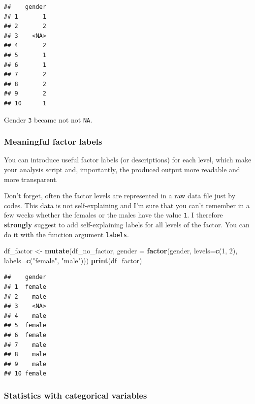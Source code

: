 \documentclass[
]{scrartcl}
\newenvironment{Shaded}{\begin{snugshade}}{\end{snugshade}}
\newcommand{\AttributeTok}[1]{\textcolor[rgb]{0.13,0.29,0.53}{#1}}
\newcommand{\DecValTok}[1]{\textcolor[rgb]{0.00,0.00,0.81}{#1}}
\newcommand{\FunctionTok}[1]{\textcolor[rgb]{0.13,0.29,0.53}{\textbf{#1}}}
\newcommand{\NormalTok}[1]{#1}
\newcommand{\OtherTok}[1]{\textcolor[rgb]{0.56,0.35,0.01}{#1}}
\newcommand{\StringTok}[1]{\textcolor[rgb]{0.31,0.60,0.02}{#1}}
\begin{document}
\begin{verbatim}
##    gender
## 1       1
## 2       2
## 3    <NA>
## 4       2
## 5       1
## 6       1
## 7       2
## 8       2
## 9       2
## 10      1
\end{verbatim}

Gender \texttt{3} became not not \texttt{NA}.

\subsubsection{Meaningful factor labels}\label{meaningful-factor-labels}

You can introduce useful factor labels (or descriptions) for each level, which make your analysis script and, importantly, the produced output more readable and more transparent.

Don't forget, often the factor levels are represented in a raw data file just by codes. This data is not self-explaining and I'm sure that you can't remember in a few weeks whether the females or the males have the value \texttt{1}. I therefore \textbf{strongly} suggest to add self-explaining labels for all levels of the factor. You can do it with the function argument \texttt{labels}.

\begin{Shaded}
\begin{Highlighting}[]
\NormalTok{df\_factor }\OtherTok{\textless{}{-}}  \FunctionTok{mutate}\NormalTok{(df\_no\_factor,}
            \AttributeTok{gender =} \FunctionTok{factor}\NormalTok{(gender, }\AttributeTok{levels=}\FunctionTok{c}\NormalTok{(}\DecValTok{1}\NormalTok{, }\DecValTok{2}\NormalTok{), }\AttributeTok{labels=}\FunctionTok{c}\NormalTok{(}\StringTok{"female"}\NormalTok{, }\StringTok{"male"}\NormalTok{)))}
\FunctionTok{print}\NormalTok{(df\_factor)}
\end{Highlighting}
\end{Shaded}

\begin{verbatim}
##    gender
## 1  female
## 2    male
## 3    <NA>
## 4    male
## 5  female
## 6  female
## 7    male
## 8    male
## 9    male
## 10 female
\end{verbatim}

\subsubsection{Statistics with categorical variables}\label{statistics-with-categorical-variables}
\end{document}
